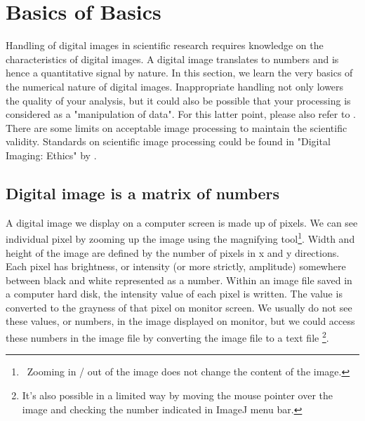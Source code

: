 
\section{Basics of Basics}

Handling of digital images in scientific research requires knowledge on
the characteristics of digital images. A digital image translates to numbers and is hence a quantitative signal by nature. In this section, we learn the very basics of the numerical nature of digital images. Inappropriate handling not
only lowers the quality of your analysis, but it could also be possible
that your processing is considered as a "manipulation
of data". For this latter point, please also refer to
\citet{Rossner2004}. There are some limits on acceptable image processing
to maintain the scientific validity. Standards on scientific image
processing could be found in "Digital Imaging:
Ethics" by \citet{Cromey2010}. 

\subsection{Digital image is a matrix of numbers}
\label{subsec:imageEQmatrix}
A digital image we display on a computer screen is made up of pixels. We can see
individual pixel by zooming up the image using the magnifying tool\footnote{\
Zooming in / out of the image does not change the content of the image.}. Width
and height of the image are defined by the number of pixels in x and y
directions. Each pixel has brightness, or intensity (or more strictly,
amplitude) somewhere between black and white represented as a number. Within
an image file saved in a computer hard disk, the intensity value of each pixel is written. The value is converted to the grayness of that pixel on monitor screen.
We usually do not see these values, or numbers, in the image displayed on
monitor, but we could access these numbers in the image file by converting 
the image file to a text file \footnote{It's also possible in a limited way by
moving the mouse pointer over the image and checking the number indicated in
ImageJ menu bar.}.

